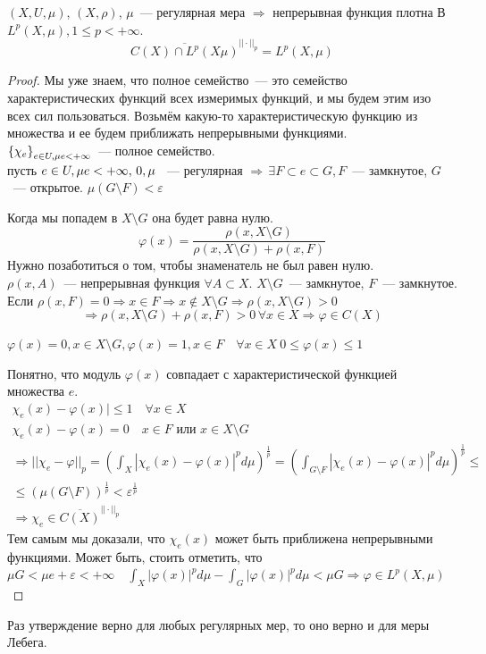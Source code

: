 \documentclass[document]{subfiles}
\begin{document}
\begin{theorem}
    $(X, U, \mu)$, $(X, \rho)$, $\mu$~--- регулярная мера $\Rightarrow$  непрерывная функция плотна В
    $L^p(X, \mu), 1 \leq p < + \infty$.
    \[ \overline{C(X) \cap L^p(X\mu)}^{|| \cdot ||_p} = L^p(X, \mu) \]
\end{theorem}
\begin{proof}
    Мы уже знаем, что полное семейство~--- это семейство характеристических функций всех
    измеримых функций, и мы будем этим изо всех сил пользоваться. Возьмём какую-то характеристическую функцию из множества и ее будем приближать
    непрерывными функциями. \\
    $\left\{ \chi_e\right\}_{e \in U, \mu e < + \infty }$~--- полное семейство. \\
    пусть $ e \in U, \mu e < + \infty, \, \let \varepsilon > 0, \mu$ ~--- регулярная $\Rightarrow 
    \, \exists F \subset e \subset G, F$~--- замкнутое, $G$~--- открытое. $\mu(G \setminus F) < \varepsilon$
    
    Когда мы попадем в $X \setminus G$ она будет равна нулю.
    \[ \varphi(x) = \frac{\rho(x, X \setminus G)}{\rho(x, X \setminus G) + \rho(x, F)} \]
    Нужно позаботиться о том, чтобы знаменатель не был равен нулю. \\
    $\rho(x,A)$~--- непрерывная функция $\forall A \subset X$. $X \setminus G$~--- замкнутое, $F$~--- замкнутое.
    Если $\rho(x, F) = 0 \Rightarrow x \in F \Rightarrow x \notin X \setminus G \Rightarrow \rho(x, X \setminus G) > 0$ 
    \[ \Rightarrow \rho(x, X \setminus G) + \rho(x, F) > 0 \, \forall x \in X \Rightarrow \varphi \in C(X) \]

    $\varphi(x) = 0, x \in X \setminus G, \varphi(x) = 1, x \in F \quad \forall x \in X \: 0 \leq \varphi(x) \leq 1$

    Понятно, что модуль $\varphi(x)$ совпадает с характеристической функцией множества $e$.
    \begin{gather*}
        \chi_e(x) - \varphi(x)| \leq 1 \quad \forall x \in X \\
        \chi_e(x) - \varphi(x) = 0 \quad x \in F \text{ или } x \in X \setminus G \\
        \Rightarrow ||\chi_e - \varphi||_p = \left( \int_X |\chi_e(x) - \varphi(x) |^p d\mu \right)^{\frac{1}{p}} = 
        \left( \int_{G \setminus F} |\chi_e(x) - \varphi(x) |^p d \mu \right)^{\frac{1}{p}} \leq \\
        \leq \left( \mu(G \setminus F) \right)^{\frac{1}{p}} < \varepsilon^{\frac{1}{p}} \\
        \Rightarrow \chi_e \in \overline{C(X)}^{|| \cdot||_p}
    \end{gather*}
    Тем самым мы доказали, что $\chi_e(x)$ может быть приближена непрерывными функциями.
    Может быть, стоить отметить, что 
    $\mu G < \mu e + \varepsilon < +\infty \quad \int_X |\varphi(x)|^p d \mu - \int_G |\varphi(x)|^p d \mu < \mu G \Rightarrow
    \varphi \in L^p(X, \mu)$
    
\end{proof}


Раз утверждение верно для любых регулярных мер, то оно верно и для меры Лебега.
\end{document}
